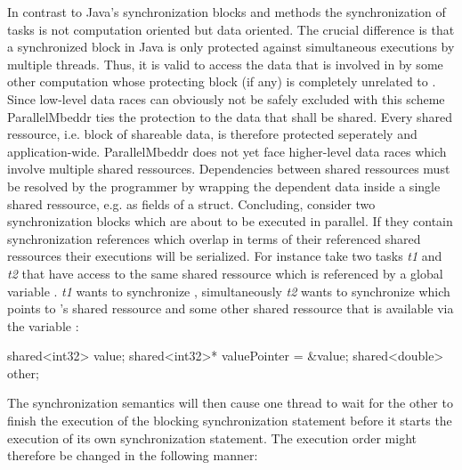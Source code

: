 In contrast to Java's synchronization blocks and methods\cite[p.~279]{JavaPerformanceTuning} the synchronization of tasks is not computation oriented but data oriented. The crucial difference is that a synchronized block  in Java is only protected against simultaneous executions by multiple threads. Thus, it is valid to access the data that is involved in  by some other computation whose protecting block (if any) is completely unrelated to . Since low-level data races can obviously not be safely excluded with this scheme ParallelMbeddr ties the protection to the data that shall be shared. Every shared ressource, i.e. block of shareable data, is therefore protected seperately and application-wide. ParallelMbeddr does not yet face higher-level data races which involve multiple shared ressources. Dependencies between shared ressources must be resolved by the programmer by wrapping the dependent data inside a single shared ressource, e.g. as fields of a struct. Concluding, consider two synchronization blocks which are about to be executed in parallel. If they contain synchronization references which overlap in terms of their referenced shared ressources their executions will be serialized. For instance take two tasks \textit{t1} and \textit{t2} that have access to the same shared ressource which is referenced by a global variable . \textit{t1} wants to synchronize , simultaneously \textit{t2} wants to synchronize  which points to 's shared ressource and some other shared ressource that is available via the variable :

\begin{ccode}
shared<int32> value;
shared<int32>* valuePointer = &value;
shared<double> other;
\end{ccode}
The synchronization semantics will then cause one thread to wait for the other to finish the execution of the blocking synchronization statement before it starts the execution of its own synchronization statement. The execution order might therefore be changed in the following manner:

